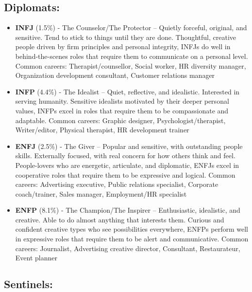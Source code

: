 \documentclass[]{book}
\begin{document}
\hypertarget{diplomats}{%
\subsection{Diplomats:}\label{diplomats}}

\begin{itemize}
\item
  \textbf{INFJ} (1.5\%) - The Counselor/The Protector -- Quietly forceful, original, and sensitive. Tend to stick to things until they are done. Thoughtful, creative people driven by firm principles and personal integrity, INFJs do well in behind-the-scenes roles that require them to communicate on a personal level. Common careers: Therapist/counsellor, Social worker, HR diversity manager, Organization development consultant, Customer relations manager
\item
  \textbf{INFP} (4.4\%) - The Idealist -- Quiet, reflective, and idealistic. Interested in serving humanity. Sensitive idealists motivated by their deeper personal values, INFPs excel in roles that require them to be compassionate and adaptable. Common careers: Graphic designer, Psychologist/therapist, Writer/editor, Physical therapist, HR development trainer
\item
  \textbf{ENFJ} (2.5\%) - The Giver -- Popular and sensitive, with outstanding people skills. Externally focused, with real concern for how others think and feel. People-lovers who are energetic, articulate, and diplomatic, ENFJs excel in cooperative roles that require them to be expressive and logical. Common careers: Advertising executive, Public relations specialist, Corporate coach/trainer, Sales manager, Employment/HR specialist
\item
  \textbf{ENFP} (8.1\%) - The Champion/The Inspirer -- Enthusiastic, idealistic, and creative. Able to do almost anything that interests them. Curious and confident creative types who see possibilities everywhere, ENFPs perform well in expressive roles that require them to be alert and communicative. Common careers: Journalist, Advertising creative director, Consultant, Restaurateur, Event planner
\end{itemize}

\hypertarget{sentinels}{%
\subsection{Sentinels:}\label{sentinels}}
\end{document}
